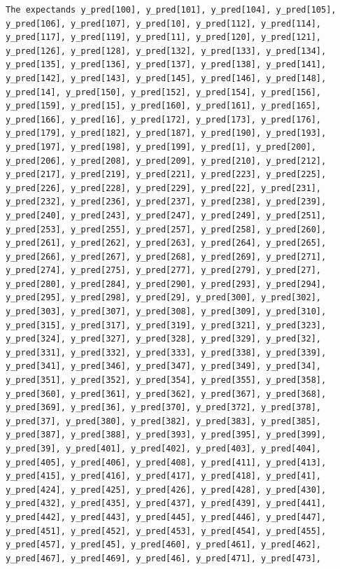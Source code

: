 \documentclass[
  letterpaper,
  DIV=11,
  numbers=noendperiod]{scrartcl}
\begin{document}
\begin{verbatim}
The expectands y_pred[100], y_pred[101], y_pred[104], y_pred[105],
y_pred[106], y_pred[107], y_pred[10], y_pred[112], y_pred[114],
y_pred[117], y_pred[119], y_pred[11], y_pred[120], y_pred[121],
y_pred[126], y_pred[128], y_pred[132], y_pred[133], y_pred[134],
y_pred[135], y_pred[136], y_pred[137], y_pred[138], y_pred[141],
y_pred[142], y_pred[143], y_pred[145], y_pred[146], y_pred[148],
y_pred[14], y_pred[150], y_pred[152], y_pred[154], y_pred[156],
y_pred[159], y_pred[15], y_pred[160], y_pred[161], y_pred[165],
y_pred[166], y_pred[16], y_pred[172], y_pred[173], y_pred[176],
y_pred[179], y_pred[182], y_pred[187], y_pred[190], y_pred[193],
y_pred[197], y_pred[198], y_pred[199], y_pred[1], y_pred[200],
y_pred[206], y_pred[208], y_pred[209], y_pred[210], y_pred[212],
y_pred[217], y_pred[219], y_pred[221], y_pred[223], y_pred[225],
y_pred[226], y_pred[228], y_pred[229], y_pred[22], y_pred[231],
y_pred[232], y_pred[236], y_pred[237], y_pred[238], y_pred[239],
y_pred[240], y_pred[243], y_pred[247], y_pred[249], y_pred[251],
y_pred[253], y_pred[255], y_pred[257], y_pred[258], y_pred[260],
y_pred[261], y_pred[262], y_pred[263], y_pred[264], y_pred[265],
y_pred[266], y_pred[267], y_pred[268], y_pred[269], y_pred[271],
y_pred[274], y_pred[275], y_pred[277], y_pred[279], y_pred[27],
y_pred[280], y_pred[284], y_pred[290], y_pred[293], y_pred[294],
y_pred[295], y_pred[298], y_pred[29], y_pred[300], y_pred[302],
y_pred[303], y_pred[307], y_pred[308], y_pred[309], y_pred[310],
y_pred[315], y_pred[317], y_pred[319], y_pred[321], y_pred[323],
y_pred[324], y_pred[327], y_pred[328], y_pred[329], y_pred[32],
y_pred[331], y_pred[332], y_pred[333], y_pred[338], y_pred[339],
y_pred[341], y_pred[346], y_pred[347], y_pred[349], y_pred[34],
y_pred[351], y_pred[352], y_pred[354], y_pred[355], y_pred[358],
y_pred[360], y_pred[361], y_pred[362], y_pred[367], y_pred[368],
y_pred[369], y_pred[36], y_pred[370], y_pred[372], y_pred[378],
y_pred[37], y_pred[380], y_pred[382], y_pred[383], y_pred[385],
y_pred[387], y_pred[388], y_pred[393], y_pred[395], y_pred[399],
y_pred[39], y_pred[401], y_pred[402], y_pred[403], y_pred[404],
y_pred[405], y_pred[406], y_pred[408], y_pred[411], y_pred[413],
y_pred[415], y_pred[416], y_pred[417], y_pred[418], y_pred[41],
y_pred[424], y_pred[425], y_pred[426], y_pred[428], y_pred[430],
y_pred[432], y_pred[435], y_pred[437], y_pred[439], y_pred[441],
y_pred[442], y_pred[443], y_pred[445], y_pred[446], y_pred[447],
y_pred[451], y_pred[452], y_pred[453], y_pred[454], y_pred[455],
y_pred[457], y_pred[45], y_pred[460], y_pred[461], y_pred[462],
y_pred[467], y_pred[469], y_pred[46], y_pred[471], y_pred[473],

\end{verbatim}
\end{document}
